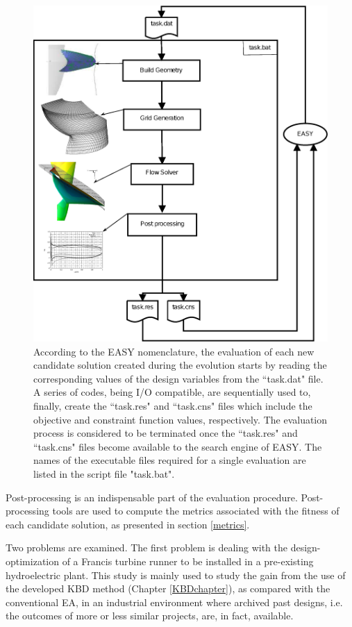 \begin{figure}[h!]
\centering
\includegraphics[width=135mm]{Optimizationloop.eps} 
\caption{According to the EASY nomenclature, the evaluation of each new candidate solution created during the evolution starts by reading the corresponding values of the design variables from the ``task.dat" file. A series of codes, being I/O compatible, are sequentially used to, finally, create the ``task.res" and ``task.cns" files which include the objective and constraint function values, respectively. The evaluation process is considered to be terminated once the ``task.res" and ``task.cns" files  become available to the search engine of EASY. The names of the executable files required for a single evaluation are listed in the script file "task.bat". }
\label{evaltool}
\end{figure}      


Post-processing is an indispensable part of the evaluation procedure. Post-processing tools are used to compute the metrics associated with the fitness of each candidate solution, as presented in section \ref{metrics}. 

Two problems are examined. The first problem is  dealing with the design-optimization of a Francis turbine runner to be installed in a pre-existing hydroelectric plant. This study is mainly used to study the gain from the use of the developed KBD method (Chapter \ref{KBDchapter}), as compared with the conventional EA, in an industrial environment where archived past designs, i.e. the outcomes of more or less similar projects, are, in fact, available.


